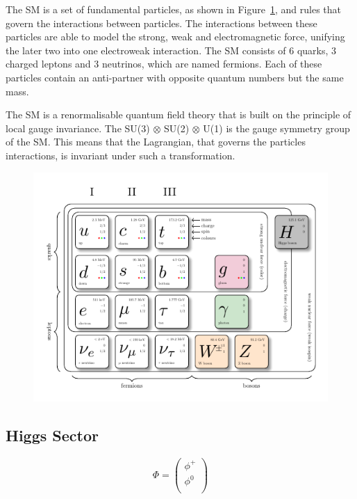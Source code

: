 The SM is a set of fundamental particles, as shown in Figure~\ref{fig:sm_diagram}, and rules that govern the interactions between particles.
The interactions between these particles are able to model the strong, weak and electromagnetic force, unifying the later two into one electroweak interaction.
The SM consists of 6 quarks, 3 charged leptons and 3 neutrinos, which are named fermions. 
Each of these particles contain an anti-partner with opposite quantum numbers but the same mass.

The SM is a renormalisable quantum field theory that is built on the principle of local gauge invariance.
The SU(3) $\otimes$ SU(2) $\otimes$ U(1) is the gauge symmetry group of the SM.
This means that the Lagrangian, that governs the particles interactions, is invariant under such a transformation.

\begin{figure}[!hbtp]
\centering
    \includegraphics[width=\textwidth]{Figures/SM_diagram.pdf}
\caption{}
\label{fig:sm_diagram}
\end{figure}

\subsection{Higgs Sector}

\begin{equation}
	\Phi = 
	\begin{pmatrix} 
		\phi^{+} \\
		\phi^{0} \\
	\end{pmatrix}
\end{equation}

